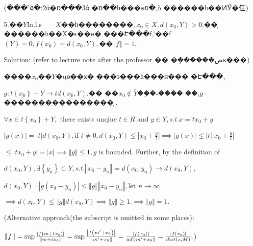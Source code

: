 \documentclass{article}
\begin{document}
\begin{CJK}{GBK}{song}
(���˹۵�:2ά�ռ���3ά%
�ռ��һ���ӿռ�,ò%
������һ��ͶӰ�任)

\bigskip

5.��$Y$Ϊn.l.s$\qquad X�� һ �� �� 
�� �� ,x_{0}\in X,d\left( x_{0},Y\right) >0.$��֤%
������һ��X�ϵ��н�%
���Է���f,ʹ��f$\left( Y\right)
=0,f\left( x_{0}\right) =d\left( x_{0},Y\right) ,$��$\left\Vert
f\right\Vert =1.$

\bigskip Solution: (refer to lecture note after the professor ��%
�ܱ������صĸ���)

����$x_{0}$��$Y$�ųɵ��ӿ�%
���϶���һ���н���%
�Է���,

$g:t\left\{ x_{0}\right\} +Y\rightarrow td\left( x_{0},Y\right) .$��%
��$x_{0}\notin \bar{Y}$��֤�˶����%
��,$g$ ����������������%
֤.

\bigskip $\forall x\in t\left\{ x_{0}\right\} +Y,$ there exists unqiue $t\in
R$ and $y\in Y,s.t.x=tx_{0}+y$

$\left\vert g\left( x\right) \right\vert =\left\vert t\right\vert d\left(
x_{0},Y\right) ,$if $t\neq 0,d\left( x_{0},Y\right) \leq \left\vert x_{0}+%
\frac{y}{t}\right\vert \implies \left\vert g\left( x\right) \right\vert \leq
\left\vert t\right\vert \left\vert x_{0}+\frac{y}{t}\right\vert $

$\leq \left\vert tx_{0}+y\right\vert =\left\vert x\right\vert \implies
\left\Vert g\right\Vert \leq 1,g$ is bounded. Further, by the definition of

$d\left( x_{0},Y\right) ,\exists \left\{ y_{n}\right\} \subset
Y,s.t.\left\Vert x_{0}-y_{n}\right\Vert =d\left( x_{0},y_{n}\right)
\rightarrow d\left( x_{0},Y\right) ,$

$d\left( x_{0},Y\right) $=$\left\vert g\left( x_{0}-y_{n}\right) \right\vert
\leq \left\Vert g\right\Vert \left\Vert x_{0}-y_{n}\right\Vert ,$let $%
n\rightarrow \infty $

$\implies d\left( x_{0},Y\right) \leq \left\Vert g\right\Vert d\left(
x_{0},Y\right) \implies \left\Vert g\right\Vert \geq 1.\implies \left\Vert
g\right\Vert =1.$

\bigskip (Alternative approach(the subscript is omitted in some places):

$\left\Vert f\right\Vert =\sup \frac{\left\vert f\left( m+tx_{0}\right)
\right\vert }{\left\Vert m+tx_{0}\right\Vert }=\sup \frac{\left\vert f\left(
m^{\prime }+x_{0}\right) \right\vert }{\left\Vert m^{\prime
}+x_{0}\right\Vert }=\frac{\left\vert f\left( x_{0}\right) \right\vert }{%
\inf \left\Vert m^{\prime }+x_{0}\right\Vert }=\frac{\left\vert f\left(
x_{0}\right) \right\vert }{dist\left( x,M\right) }.$)


\end{CJK}
\end{document}
